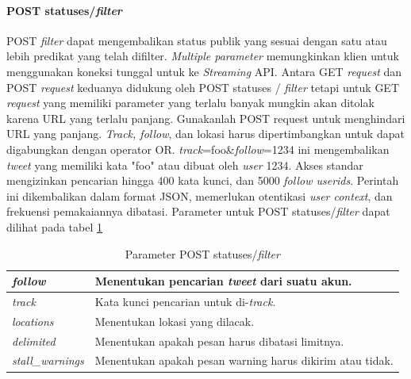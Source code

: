\paragraph{POST statuses/\textit{filter}}
POST \textit{filter} dapat mengembalikan status publik yang sesuai dengan satu atau lebih predikat yang telah difilter. \textit{Multiple parameter} memungkinkan klien untuk menggunakan koneksi tunggal untuk ke \textit{Streaming} API. Antara GET \textit{request} dan POST \textit{request} keduanya didukung oleh POST statuses / \textit{filter} tetapi untuk GET \textit{request} yang memiliki parameter yang terlalu banyak mungkin akan ditolak karena URL yang terlalu panjang. Gunakanlah POST request untuk menghindari URL yang panjang.
\textit{Track, follow}, dan lokasi harus dipertimbangkan untuk dapat digabungkan dengan operator OR. \textit{track}=foo\&\textit{follow}=1234 ini mengembalikan \textit{tweet} yang memiliki kata "foo" atau dibuat oleh \textit{user} 1234.
Akses standar mengizinkan pencarian hingga 400 kata kunci, dan 5000 \textit{follow userids}. Perintah ini dikembalikan dalam format JSON, memerlukan otentikasi \textit{user context}, dan frekuensi pemakaiannya dibatasi. Parameter untuk POST statuses/\textit{filter} dapat dilihat pada tabel \ref{table:ParameterPostStatusesFilter}



\begin{table}[h]
\caption{Parameter POST statuses/\textit{filter}}
\label{table:ParameterPostStatusesFilter}
\begin{tabular}{|p{3cm}|p{11cm}|}
\hline
\textit{follow}          & Menentukan pencarian \textit{tweet} dari suatu akun. \\ \hline
\textit{track}           & Kata kunci pencarian untuk di-\textit{track}.              \\ \hline
\textit{locations}       & Menentukan lokasi yang dilacak.                                                    \\ \hline
\textit{delimited}       & Menentukan apakah pesan harus dibatasi limitnya.                                         \\ \hline
\textit{stall\_warnings} & Menentukan apakah pesan warning harus dikirim atau tidak. \\ \hline                                        
\end{tabular}
\end{table}


